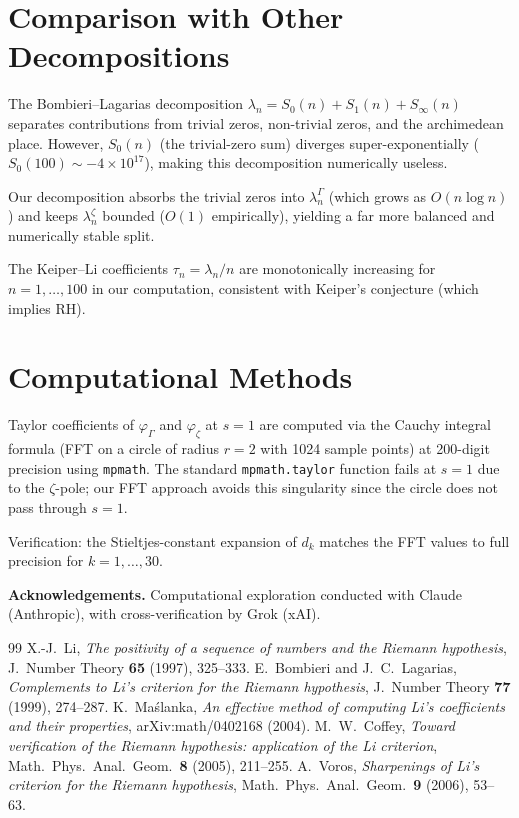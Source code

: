\documentclass[11pt,a4paper]{article}
\newcommand{\Li}{\lambda}
\newcommand{\LiG}{\lambda^{\Gamma}}
\newcommand{\LiZ}{\lambda^{\zeta}}
\begin{document}
\section{Comparison with Other Decompositions}

The Bombieri--Lagarias \cite{BL1999} decomposition
$\Li_n = S_0(n) + S_1(n) + S_\infty(n)$ separates contributions from
trivial zeros, non-trivial zeros, and the archimedean place. However,
$S_0(n)$ (the trivial-zero sum) diverges super-exponentially
($S_0(100) \sim -4\times 10^{17}$), making this decomposition numerically
useless.

Our decomposition absorbs the trivial zeros into $\LiG_n$ (which grows
as $O(n\log n)$) and keeps $\LiZ_n$ bounded ($O(1)$ empirically),
yielding a far more balanced and numerically stable split.

The Keiper--Li coefficients $\tau_n = \Li_n/n$ are monotonically increasing
for $n=1,\ldots,100$ in our computation, consistent with Keiper's conjecture
(which implies RH).

\section{Computational Methods}

Taylor coefficients of $\varphi_\Gamma$ and $\varphi_\zeta$ at $s=1$ are
computed via the Cauchy integral formula (FFT on a circle of radius $r=2$
with 1024 sample points) at 200-digit precision using \texttt{mpmath}.
The standard \texttt{mpmath.taylor} function fails at $s=1$ due to the
$\zeta$-pole; our FFT approach avoids this singularity since the circle
does not pass through $s=1$.

Verification: the Stieltjes-constant expansion of $d_k$ matches the FFT
values to full precision for $k=1,\ldots,30$.

\bigskip
\noindent\textbf{Acknowledgements.}
Computational exploration conducted with Claude (Anthropic), with
cross-verification by Grok (xAI).

\begin{thebibliography}{99}
 X.-J.\ Li, \emph{The positivity of a sequence of numbers
  and the Riemann hypothesis}, J.\ Number Theory \textbf{65} (1997), 325--333.
 E.\ Bombieri and J.\ C.\ Lagarias,
  \emph{Complements to Li's criterion for the Riemann hypothesis},
  J.\ Number Theory \textbf{77} (1999), 274--287.
 K.\ Ma\'{s}lanka, \emph{An effective method of computing
  Li's coefficients and their properties}, arXiv:math/0402168 (2004).
 M.\ W.\ Coffey, \emph{Toward verification of the Riemann
  hypothesis: application of the Li criterion},
  Math.\ Phys.\ Anal.\ Geom.\ \textbf{8} (2005), 211--255.
 A.\ Voros, \emph{Sharpenings of Li's criterion for the
  Riemann hypothesis}, Math.\ Phys.\ Anal.\ Geom.\ \textbf{9} (2006), 53--63.
\end{thebibliography}
\end{document}

